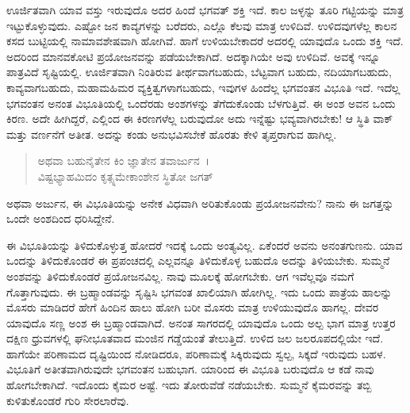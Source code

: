 ಊರ್ಜಿತವಾಗಿ ಯಾವ ವಸ್ತು ಇರುವುದೊ ಅದರ ಹಿಂದೆ ಭಗವತ್ ಶಕ್ತಿ ಇದೆ. ಕಾಲ ಜಳ್ಳನ್ನು ತೂರಿ ಗಟ್ಟಿಯನ್ನು ಮಾತ್ರ ಇಟ್ಟುಕೊಳ್ಳುವುದು. ಎಷ್ಟೋ ಜನ ಕಾವ್ಯಗಳನ್ನು ಬರೆದರು, ಎಲ್ಲೊ ಕೆಲವು ಮಾತ್ರ ಉಳಿದಿವೆ. ಉಳಿದವುಗಳೆಲ್ಲ ಕಾಲನ ಕಸದ ಬುಟ್ಟಿಯಲ್ಲಿ ನಾಮಾವಶೇಷವಾಗಿ ಹೋಗಿವೆ. ಹಾಗೆ ಉಳಿಯಬೇಕಾದರೆ ಅದರಲ್ಲಿ ಯಾವುದೊ ಒಂದು ಶಕ್ತಿ ಇದೆ. ಅದರಿಂದ ಮಾನವಕೋಟಿ ಪ್ರಯೋಜನವನ್ನು ಪಡೆಯಬೇಕಾಗಿದೆ. ಅದಕ್ಕಾಗಿಯೇ ಅವು ಉಳಿದಿವೆ. ಅವಕ್ಕೆ ಇನ್ನೂ ಪಾತ್ರವಿದೆ ಸೃಷ್ಟಿಯಲ್ಲಿ. ಊರ್ಜಿತವಾಗಿ ನಿಂತಿರುವ ತೀರ್ಥವಾಗಬಹುದು, ಬೆಟ್ಟವಾಗ ಬಹುದು, ನದಿಯಾಗಬಹುದು, ಕಾವ್ಯವಾಗಬಹುದು, ಮಹಾಮಹಿಮರ ವ್ಯಕ್ತಿತ್ವಗಳಾಗಬಹುದು, ಇವುಗಳ ಹಿಂದೆಲ್ಲ ಭಗವಂತನ ವಿಭೂತಿ ಇದೆ. ಇದೆಲ್ಲ ಭಗವಂತನ ಅನಂತ ವಿಭೂತಿಯಲ್ಲಿ ಒಂದೆರಡು ಅಂಶಗಳನ್ನು ತೆಗೆದುಕೊಂಡು ಬೆಳಗುತ್ತಿವೆ. ಈ ಅಂಶ ಅವನ ಒಂದು ಕಿರಣ. ಅದೇ ಹೀಗಿದ್ದರೆ, ಎಲ್ಲಿಂದ ಈ ಕಿರಣಗಳೆಲ್ಲ ಬರುವುದೋ ಅದು ಇನ್ನೆಷ್ಟು ಭವ್ಯವಾಗಿರಬೇಕು! ಆ ಸ್ಥಿತಿ ವಾಕ್ ಮತ್ತು ವರ್ಣನೆಗೆ ಅತೀತ. ಅದನ್ನು ಕಂಡು ಅನುಭವಿಸಬೇಕೆ ಹೊರತು ಕೇಳಿ ತೃಪ್ತರಾಗುವ ಹಾಗಿಲ್ಲ.

\begin{verse}
ಅಥವಾ ಬಹುನೈತೇನ ಕಿಂ ಜ್ಞಾತೇನ ತವಾರ್ಜುನ~।\\ವಿಷ್ಟಭ್ಯಾಹಮಿದಂ ಕೃತ್ಸ್ನಮೇಕಾಂಶೇನ ಸ್ಥಿತೋ ಜಗತ್ 
\end{verse}

{\small ಅಥವಾ ಅರ್ಜುನ, ಈ ವಿಭೂತಿಯನ್ನು ಅನೇಕ ವಿಧವಾಗಿ ಅರಿತುಕೊಂಡು ಪ್ರಯೋಜನವೇನು? ನಾನು ಈ ಜಗತ್ತನ್ನು ಒಂದೇ ಅಂಶದಿಂದ ಧರಿಸಿದ್ದೇನೆ.}

ಈ ವಿಭೂತಿಯನ್ನು ತಿಳಿದುಕೊಳ್ಳುತ್ತ ಹೋದರೆ ಇದಕ್ಕೆ ಒಂದು ಅಂತ್ಯವಿಲ್ಲ. ಏಕೆಂದರೆ ಅವನು ಅನಂತಗುಣನು. ಯಾವ ಒಂದನ್ನು ತಿಳಿದುಕೊಂಡರೆ ಈ ಪ್ರಪಂಚದಲ್ಲಿ ಎಲ್ಲವನ್ನೂ ತಿಳಿದುಕೊಳ್ಳ ಬಹುದೊ ಅದನ್ನು ತಿಳಿಯಬೇಕು. ಸುಮ್ಮನೆ ಅಂಶವನ್ನು ತಿಳಿದುಕೊಂಡರೆ ಪ್ರಯೋಜನವಿಲ್ಲ. ನಾವು ಮೂಲಕ್ಕೆ ಹೋಗಬೇಕು. ಆಗ ಇವೆಲ್ಲವೂ ನಮಗೆ ಗೊತ್ತಾಗುವುದು. ಈ ಬ್ರಹ್ಮಾಂಡವನ್ನು ಸೃಷ್ಟಿಸಿ ಭಗವಂತ ಖಾಲಿಯಾಗಿ ಹೋಗಿಲ್ಲ. ಇದು ಒಂದು ಪಾತ್ರೆಯ ಹಾಲನ್ನು ಮೊಸರು ಮಾಡಿದರೆ ಹೇಗೆ ಹಿಂದಿನ ಹಾಲು ಹೋಗಿ ಬರೀ ಮೊಸರು ಮಾತ್ರ ಉಳಿಯುವುದೊ ಹಾಗಲ್ಲ. ದೇವರ ಯಾವುದೊ ಸಣ್ಣ ಅಂಶ ಈ ಬ್ರಹ್ಮಾಂಡವಾಗಿದೆ. ಅನಂತ ಸಾಗರದಲ್ಲಿ ಯಾವುದೊ ಒಂದು ಅಲ್ಪ ಭಾಗ ಮಾತ್ರ ಉತ್ತರ ದಕ್ಷಿಣ ಧ್ರುವಗಳಲ್ಲಿ ಘನೀಭೂತವಾದ ಮಂಜಿನ ಗಡ್ಡೆಯಂತೆ ತೇಲುತ್ತಿದೆ. ಉಳಿದ ಜಲ ಜಲರೂಪದಲ್ಲಿಯೇ ಇದೆ. ಹಾಗೆಯೇ ಪರಿಣಾಮದ ದೃಷ್ಟಿಯಿಂದ ನೋಡಿದರೂ, ಪರಿಣಾಮಕ್ಕೆ ಸಿಕ್ಕಿರುವುದು ಸ್ವಲ್ಪ, ಸಿಕ್ಕದೆ ಇರುವುದು ಬಹಳ. ವಿಭೂತಿಗೆ ಅತೀತವಾಗಿರುವುದೇ ಭಗವಂತನ ಬಹುಭಾಗ. ಯಾರಿಂದ ಈ ವಿಭೂತಿ ಬರುವುದೊ ಆ ಕಡೆ ನಾವು ಹೋಗಬೇಕಾಗಿದೆ. ಇದೊಂದು ಕೈಮರ ಅಷ್ಟೆ. ಇದು ತೋರುವೆಡೆ ನಡೆಯಬೇಕು. ಸುಮ್ಮನೆ ಕೈಮರವನ್ನು ತಬ್ಬಿ ಕುಳಿತುಕೊಂಡರೆ ಗುರಿ ಸೇರಲಾರೆವು.

